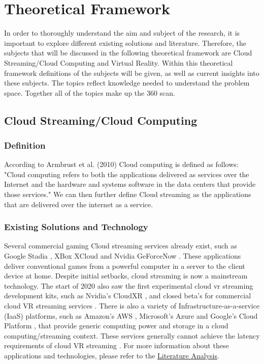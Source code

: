 \section{Theoretical Framework}

In order to thoroughly understand the aim and subject of the research, it is important to explore different existing solutions and literature. Therefore, the subjects that will be discussed in the following theoretical framework are Cloud Streaming/Cloud Computing and Virtual Reality. Within this theoretical framework definitions of the subjects will be given, as well as current insights into these subjects. The topics reflect knowledge needed to understand the problem space. Together all of the topics make up the 360 scan.

\subsection{Cloud Streaming/Cloud Computing}

\subsubsection{Definition}
According to Armbrust et al. (2010) Cloud computing is defined as follows: 
"Cloud computing refers to both the applications delivered as services over the Internet and the hardware and systems software in the data centers that provide those services." \parencite[]{aviewoncc}
We can then further define Cloud streaming as the applications that are delivered over the internet as a service.

\subsubsection{Existing Solutions and Technology}
Several commercial gaming Cloud streaming services already exist, such as Google Stadia \parencite{stadia}, XBox XCloud \parencite{xcloud} and Nvidia GeForceNow \parencite{geforcenow}. These applications deliver conventional games from a powerful computer in a server to the client device at home. Despite initial setbacks, cloud streaming is now a mainstream technology. The start of 2020 also saw the first experimental cloud \acrshort{vr} streaming development kits, such as Nvidia's CloudXR \parencite{cloudxr}, and closed beta's for commercial cloud VR streaming services \parencite{shadowvr}. There is also a variety of Infrastructure\hyp{}as\hyp{}a\hyp{}service (IaaS) platforms, such as Amazon's AWS \parencite{aws}, Microsoft's Azure \parencite{azure} and Google's Cloud Platform \parencite{gcp}, that provide generic computing power and storage in a cloud computing/streaming context. These services generally cannot achieve the latency requirements of cloud VR streaming \parencite{survey_IRSS}. For more information about these applications and technologies, please refer to the \hyperref[sec:lit]{Literature Analysis}.

